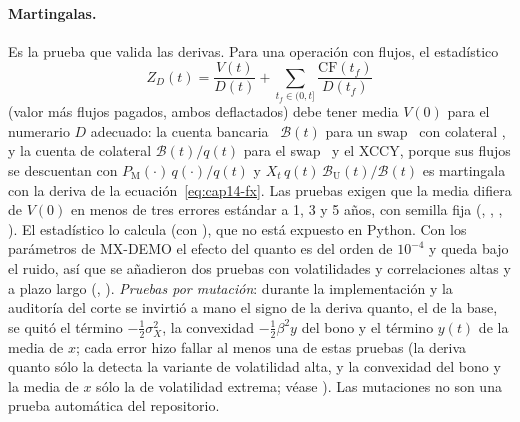 \begin{raggedright}
\paragraph{Martingalas.} Es la prueba que valida las derivas. Para una operación con flujos, el estadístico
\begin{equation}\label{eq:cap14-martingala}
  Z_D(t)=\frac{V(t)}{D(t)}+\sum_{t_f\in(0,t]}\frac{\mathrm{CF}(t_f)}{D(t_f)}
\end{equation}
(valor más flujos pagados, ambos deflactados) debe tener media $V(0)$ para el numerario $D$ adecuado: la cuenta
bancaria \cTIIE\ $\mathcal B(t)$ para un swap \MXN\ con colateral \MXN, y la cuenta de colateral $\mathcal B(t)/q(t)$ para el
swap \USD\ y el XCCY, porque sus flujos se descuentan con $P_{\mathrm M}(\cdot)\,q(\cdot)/q(t)$ y $X_t\,q(t)\,\mathcal B_{\mathrm U}(t)/\mathcal B(t)$
es martingala con la deriva de la ecuación~\eqref{eq:cap14-fx}. Las pruebas exigen que la media difiera de
$V(0)$ en menos de tres errores estándar a 1, 3 y 5 años, con semilla fija
(,
,
,
). El estadístico lo calcula
 (con
), que no está expuesto en Python. Con los parámetros de
MX-DEMO el efecto del quanto es del orden de $10^{-4}$ y queda bajo el ruido, así que se añadieron dos pruebas con
volatilidades y correlaciones altas y a plazo largo
(,
).
\emph{Pruebas por mutación}: durante la implementación y la auditoría del corte se invirtió a mano el signo de la
deriva quanto, el de la base, se quitó el término $-\tfrac12\sigma_X^2$, la convexidad $-\tfrac12\beta^2y$ del bono y
el término $y(t)$ de la media de $x$; cada error hizo fallar al menos una de estas pruebas (la deriva quanto sólo la
detecta la variante de volatilidad alta, y la convexidad del bono y la media de $x$ sólo la de volatilidad extrema;
véase ). Las mutaciones no son una prueba
automática del repositorio.


\end{raggedright}

